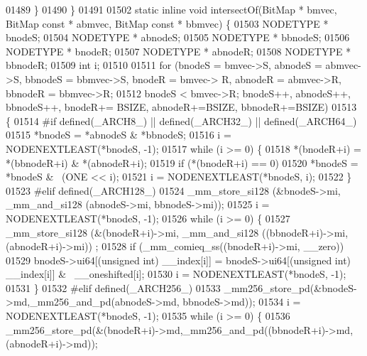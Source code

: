 \begin{DoxyCode}
{01489         \}
01490 \}
01491 
01502 \textcolor{keyword}{static} \textcolor{keyword}{inline} \textcolor{keywordtype}{void} intersectOf(BitMap * bmvec, BitMap \textcolor{keyword}{const} * abmvec, BitMap \textcolor{keyword}{const} * bbmvec) \{
01503         NODETYPE * bnodeS;
01504         NODETYPE * abnodeS;
01505         NODETYPE * bbnodeS;
01506         NODETYPE * bnodeR;
01507         NODETYPE * abnodeR;
01508         NODETYPE * bbnodeR;
01509         \textcolor{keywordtype}{int} i;
01510 
01511         \textcolor{keywordflow}{for} (bnodeS = bmvec->S, abnodeS = abmvec->S, bbnodeS = bbmvec->S, bnodeR = bmvec->
      R, abnodeR = abmvec->R, bbnodeR = bbmvec->R;
01512                         bnodeS < bmvec->R; bnodeS++, abnodeS++, bbnodeS++, bnodeR+=
      BSIZE, abnodeR+=BSIZE, bbnodeR+=BSIZE)
01513         \{
01514 \textcolor{preprocessor}{#if defined(\_ARCH8\_) || defined(\_ARCH32\_) || defined(\_ARCH64\_)}
01515                 *bnodeS = *abnodeS & *bbnodeS;
01516                 i = NODENEXTLEAST(*bnodeS, -1);
01517                 \textcolor{keywordflow}{while} (i >= 0) \{
01518                         *(bnodeR+i) = *(bbnodeR+i) & *(abnodeR+i);
01519                         \textcolor{keywordflow}{if} (*(bnodeR+i) == 0)
01520                                 *bnodeS = *bnodeS & ~(ONE << i);
01521                         i = NODENEXTLEAST(*bnodeS, i);
01522                 \}
01523 \textcolor{preprocessor}{#elif defined(\_ARCH128\_)}
01524                 \_mm\_store\_si128 (&bnodeS->mi, \_mm\_and\_si128 (abnodeS->mi, bbnodeS->mi));
01525                 i = NODENEXTLEAST(*bnodeS, -1);
01526                 \textcolor{keywordflow}{while} (i >= 0) \{
01527                         \_mm\_store\_si128 (&(bnodeR+i)->mi, \_mm\_and\_si128 ((bbnodeR+i)->mi, (abnodeR+i)->mi))
      ;
01528                         \textcolor{keywordflow}{if} (\_mm\_comieq\_ss((bnodeR+i)->mi, \_\_zero))
01529                                 bnodeS->ui64[(\textcolor{keywordtype}{unsigned} int) \_\_index[i]] = bnodeS->ui64[(\textcolor{keywordtype}{unsigned} \textcolor{keywordtype}{int}) 
      \_\_index[i]] & ~\_\_oneshifted[i];
01530                         i = NODENEXTLEAST(*bnodeS, -1);
01531                 \}
01532 \textcolor{preprocessor}{#elif defined(\_ARCH256\_)}
01533                 \_mm256\_store\_pd(&bnodeS->md,\_mm256\_and\_pd(abnodeS->md, bbnodeS->md));
01534                 i = NODENEXTLEAST(*bnodeS, -1);
01535                 \textcolor{keywordflow}{while} (i >= 0) \{
01536                         \_mm256\_store\_pd(&(bnodeR+i)->md,\_mm256\_and\_pd((bbnodeR+i)->md, (abnodeR+i)->md));
}
\end{DoxyCode}
